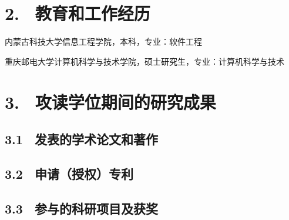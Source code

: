 \section{2. \ 教育和工作经历}
\begin{description}[leftmargin=3.5cm, style=sameline]
\item[2017.09$\sim$2021.07] 内蒙古科技大学信息工程学院，本科，专业：软件工程
\item[2022.09$\sim$2025.06] 重庆邮电大学计算机科学与技术学院，硕士研究生，专业：计算机科学与技术
\end{description}


\section{3. \ 攻读学位期间的研究成果}

\subsection{3.1 \ 发表的学术论文和著作}

\subsection{3.2 \ 申请（授权）专利}

\subsection{3.3 \ 参与的科研项目及获奖}
